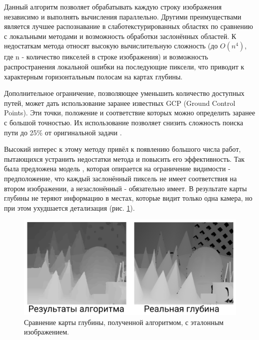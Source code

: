Данный алгоритм позволяет обрабатывать каждую строку изображения независимо и выполнять вычисления параллельно. Другими преимуществами является лучшее распознавание в слаботекстурированных 
областях по сравнению с локальными методами и возможность обработки заслонённых областей.   %
К недостаткам метода относят высокую вычислительную сложность (до $O(n^4)$, где n - количество пикселей в строке изображения) и возможность распространения локальной ошибки на последующие пиксели, что приводит к характерным горизонтальным полосам на картах глубины. 

Дополнительное ограничение, позволяющее уменьшить количество доступных путей, может дать использование заранее известных GCP (Ground Control Points). Эти точки, положение и 
соответствие которых можно определить заранее с большой точностью. Их использование позволяет снизить сложность поиска пути до 25\% от оригинальной задачи \cite{DSI}. 

Высокий интерес к этому методу привёл к появлению большого числа работ, пытающихся устранить недостатки метода и повысить его эффективность. Так была предложена модель \cite{symmetric}, которая 
опирается на ограничение видимости - предположение, что каждый заслонённый пиксель не имеет соответствия на втором изображении, а незаслонённый - обязательно имеет. В результате карты глубины не теряют информацию 
в местах, которые видит только одна камера, но при этом ухудшается детализация (рис. \ref{pic:symmetry}). 
\begin{figure}[H]
	\begin{center}
		\includegraphics[scale=0.3]{pics/symmetric_rus.png}
		\caption{ Сравнение карты глубины, полученной алгоритмом, с эталонным изображением. } 
		\label{pic:symmetry} %
	\end{center}
\end{figure}

